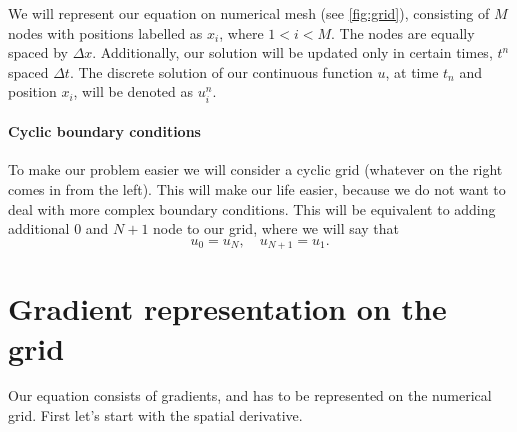 \documentclass[justified, nobib,a4paper]{tufte-handout}
\begin{document}
\begin{marginfigure}
	\caption{Numerical grid}\label{fig:grid}
\end{marginfigure}

We will represent our equation on numerical mesh (see
\cref{fig:grid}), consisting of $M$ nodes with
positions labelled as $x_i$, where $1 < i < M$. The nodes are equally spaced by
$\Delta x$. Additionally, our solution will be updated only in certain times,
$t^n$ spaced $\Delta t$. The discrete solution of our continuous function $u$,
at time $t_n$ and position $x_i$, will be denoted as $u_i^n$.

\paragraph{Cyclic boundary conditions}
To make our problem easier we will consider a cyclic grid (whatever  on the right comes in from the left). This will make our life easier,
because we do not want to deal with more complex boundary conditions. This will be
equivalent to adding additional $0$ and $N+1$ node to our grid, where we will say
that
\[
	u_0 = u_N,\quad u_{N+1} = u_1.
\]
\section{Gradient representation on the grid}
Our equation consists of gradients, and has to be represented on the numerical grid.
First let's start with the spatial derivative.
\end{document}
